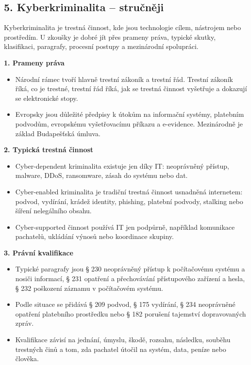 
\subsection*{5. Kyberkriminalita -- stručněji}
Kyberkriminalita je trestná činnost, kde jsou technologie cílem, nástrojem nebo prostředím. U zkoušky je dobré jít přes prameny práva, typické skutky, klasifikaci, paragrafy, procesní postupy a mezinárodní spolupráci.

\textbf{1. Prameny práva}
\begin{itemize}
  \item Národní rámec tvoří hlavně trestní zákoník a trestní řád. Trestní zákoník říká, co je trestné, trestní řád říká, jak se trestná činnost vyšetřuje a dokazují se elektronické stopy.
  \item Evropsky jsou důležité předpisy k útokům na informační systémy, platebním podvodům, evropskému vyšetřovacímu příkazu a e-evidence. Mezinárodně je základ Budapešťská úmluva.
\end{itemize}

\textbf{2. Typická trestná činnost}
\begin{itemize}
  \item Cyber-dependent kriminalita existuje jen díky IT: neoprávněný přístup, malware, DDoS, ransomware, zásah do systému nebo dat.
  \item Cyber-enabled kriminalita je tradiční trestná činnost usnadněná internetem: podvod, vydírání, krádež identity, phishing, platební podvody, stalking nebo šíření nelegálního obsahu.
  \item Cyber-supported činnost používá IT jen podpůrně, například komunikace pachatelů, ukládání výnosů nebo koordinace skupiny.
\end{itemize}

\textbf{3. Právní kvalifikace}
\begin{itemize}
  \item Typické paragrafy jsou § 230 neoprávněný přístup k počítačovému systému a nosiči informací, § 231 opatření a přechovávání přístupového zařízení a hesla, § 232 poškození záznamu v počítačovém systému.
  \item Podle situace se přidává § 209 podvod, § 175 vydírání, § 234 neoprávněné opatření platebního prostředku nebo § 182 porušení tajemství dopravovaných zpráv.
  \item Kvalifikace závisí na jednání, úmyslu, škodě, rozsahu, následku, souběhu trestných činů a tom, zda pachatel útočil na systém, data, peníze nebo člověka.
\end{itemize}

